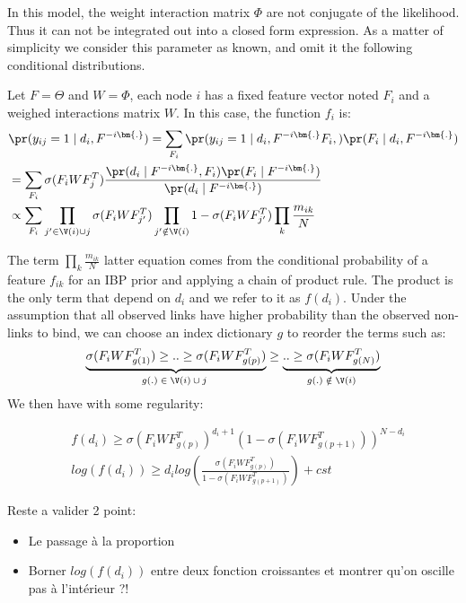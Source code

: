 In this model, the weight interaction matrix $\Phi$ are not conjugate of the likelihood. Thus it can not be integrated out into a closed form expression. As a matter of simplicity we consider this parameter as known, and omit it the following conditional distributions.

Let $F=\Theta$ and $W=\Phi$, each node $i$ has a fixed feature vector noted $F_i$ and a weighed interactions matrix $W$. In this case, the function $f_i$ is:
\begin{align}
&\pr(y_{ij}=1 \mid d_i, F^{-i\bm{.}}) = \sum_{F_i} \pr(y_{ij}=1 \mid d_i, F^{-i\bm{.}} F_i,) \pr(F_i \mid d_i, F^{-i\bm{.}}) \\
&= \sum_{F_i} \sigma(F_iWF_j^T) \frac{\pr(d_i \mid F^{-i\bm{.}}, F_i) \pr(F_i\mid F^{-i\bm{.}}) }{\pr(d_i\mid F^{-i\bm{.}})}\\
&\propto \sum_{F_i} \prod_{j' \in \V(i) \cup {j}} \sigma(F_iWF_{j'}^T)\prod_{j' \notin \V(i)} 1-\sigma(F_iWF_{j'}^T) \prod_k \frac{m_{ik}}{N}
\end{align}

The term $\prod_k \frac{m_{ik}}{N}$ latter equation comes from the conditional probability of a feature $f_{ik}$ for an IBP prior and applying a chain of product rule. The product is the only term that depend on $d_i$ and we refer to it as $f(d_i)$.
Under the assumption that all observed links have higher probability than the observed non-links to bind, we can choose an index dictionary $g$ to reorder the terms such as:
\begin{equation}
\underbrace{\sigma(F_iWF_{g(1)}^T) \geq .. \geq\sigma(F_iWF_{g(p)}^T) }_\text{$g(.) \in \V(i) \cup {j}$ }\geq \underbrace{ .. \geq \sigma(F_iWF_{g(N)}^T)}_\text{$g(.) \notin \V(i)$}
\end{equation}
We then have with some regularity:

\begin{align}
&f(d_i)\geq \sigma(F_iWF_{g(p)}^T)^{d_i +1} (1 - \sigma(F_iWF_{g(p+1)}^T))^{N - d_i} \\
&log(f(d_i)) \geq d_i log(\frac{\sigma(F_iWF_{g(p)}^T)}{1-  \sigma(F_iWF_{g(p+1)}^T)}) + cst
\end{align}


Reste a valider 2 point:
\begin{itemize}
	\item Le passage à la proportion
	\item Borner $log(f(d_i))$ entre deux fonction croissantes et montrer qu'on oscille pas à l'intérieur ?!
\end{itemize}

